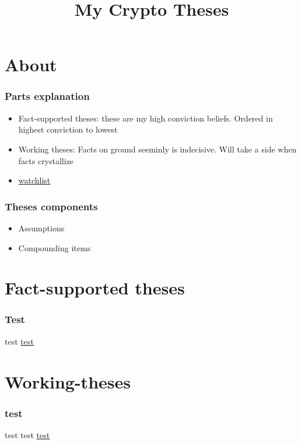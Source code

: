 \documentclass{../notes}
\title{My Crypto Theses}
\begin{document}
\maketitle

\tableofcontents

\part{About}

\section{Parts explanation}
\begin{itemize}
    \item Fact-supported theses: these are my high conviction beliefs. Ordered in highest conviction to lowest
    \item Working theses: Facts on ground seeminly is indecisive. Will take a side when facts crystallize
    \item \href{run:../analysis/213-1c.pdf}{watchlist}

\end{itemize}

\section{Theses components}
\begin{itemize}
    \item Assumptions
    \item Compounding items
\end{itemize}

\part{Fact-supported theses}

\section{Test}
test \href{https://www.overleaf.com/learn/latex/Hyperlinks}{test}

\part{Working-theses}
\section{test}
test test \href{run:./messari-2022-crypto-theses.pdf}{test}
\end{document}
